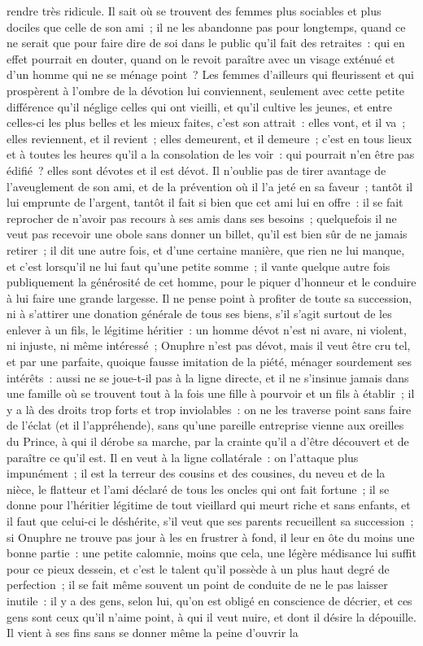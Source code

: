 \documentclass[french,twoside]{book} %
\begin{document}
rendre très ridicule. Il sait où se trouvent des femmes plus sociables et plus dociles que celle de son ami ; il ne les abandonne pas pour longtemps, quand ce ne serait que pour faire dire de soi dans le public qu’il fait des retraites : qui en effet pourrait en douter, quand on le revoit paraître avec un visage exténué et d’un homme qui ne se ménage point ? Les femmes d’ailleurs qui fleurissent et qui prospèrent à l’ombre de la dévotion lui conviennent, seulement avec cette petite différence qu’il néglige celles qui ont vieilli, et qu’il cultive les jeunes, et entre celles-ci les plus belles et les mieux faites, c’est son attrait : elles vont, et il va ; elles reviennent, et il revient ; elles demeurent, et il demeure ; c’est en tous lieux et à toutes les heures qu’il a la consolation de les voir : qui pourrait n’en être pas édifié ? elles sont dévotes et il est dévot. Il n’oublie pas de tirer avantage de l’aveuglement de son ami, et de la prévention où il l’a jeté en sa faveur ; tantôt il lui emprunte de l’argent, tantôt il fait si bien que cet ami lui en offre : il se fait reprocher de n’avoir pas recours à ses amis dans ses besoins ; quelquefois il ne veut pas recevoir une obole sans donner un billet, qu’il est bien sûr de ne jamais retirer ; il dit une autre fois, et d’une certaine manière, que rien ne lui manque, et c’est lorsqu’il ne lui faut qu’une petite somme ; il vante quelque autre fois publiquement la générosité de cet homme, pour le piquer d’honneur et le conduire à lui faire une grande largesse. Il ne pense point à profiter de toute sa succession, ni à s’attirer une donation générale de tous ses biens, s’il s’agit surtout de les enlever à un fils, le légitime héritier : un homme dévot n’est ni avare, ni violent, ni injuste, ni même intéressé ; Onuphre n’est pas dévot, mais il veut être cru tel, et par une parfaite, quoique fausse imitation de la piété, ménager sourdement ses intérêts : aussi ne se joue-t-il pas à la ligne directe, et il ne s’insinue jamais dans une famille où se trouvent tout à la fois une fille à pourvoir et un fils à établir ; il y a là des droits trop forts et trop inviolables : on ne les traverse point sans faire de l’éclat (et il l’appréhende), sans qu’une pareille entreprise vienne aux oreilles du Prince, à qui il dérobe sa marche, par la crainte qu’il a d’être découvert et de paraître ce qu’il est. Il en veut à la ligne collatérale : on l’attaque plus impunément ; il est la terreur des cousins et des cousines, du neveu et de la nièce, le flatteur et l’ami déclaré de tous les oncles qui ont fait fortune ; il se donne pour l’héritier légitime de tout vieillard qui meurt riche et sans enfants, et il faut que celui-ci le déshérite, s’il veut que ses parents recueillent sa succession ; si Onuphre ne trouve pas jour à les en frustrer à fond, il leur en ôte du moins une bonne partie : une petite calomnie, moins que cela, une légère médisance lui suffit pour ce pieux dessein, et c’est le talent qu’il possède à un plus haut degré de perfection ; il se fait même souvent un point de conduite de ne le pas laisser inutile : il y a des gens, selon lui, qu’on est obligé en conscience de décrier, et ces gens sont ceux qu’il n’aime point, à qui il veut nuire, et dont il désire la dépouille. Il vient à ses fins sans se donner même la peine d’ouvrir la 
\end{document}
